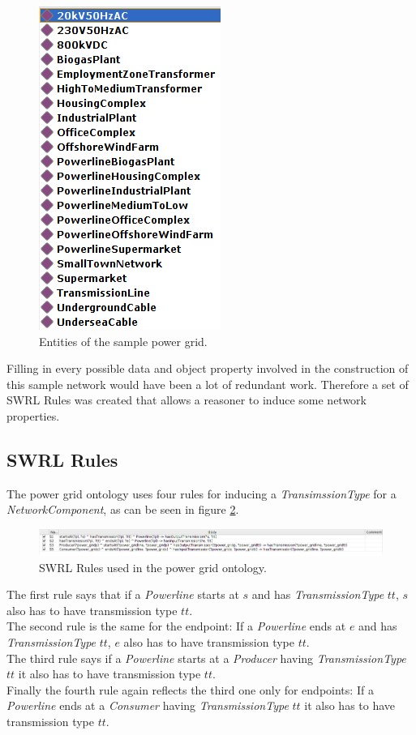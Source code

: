 \begin{figure}
\centering
\includegraphics[width=.3\textwidth]{img/entities.png}
\caption{Entities of the sample power grid.}
\label{fig:entities}
\end{figure}

Filling in every possible data and object property involved in the construction of this sample network would have been a lot of redundant work. Therefore a set of SWRL Rules was created that allows a reasoner to induce some network properties.

\subsection{SWRL Rules}

The power grid ontology uses four rules for inducing a \textit{TransimssionType} for a \textit{NetworkComponent}, as can be seen in figure \ref{fig:swrlRules}. \\

\begin{figure}[h]
\centering
\includegraphics[width=\textwidth]{img/swrlRules.png}
\caption{SWRL Rules used in the power grid ontology.}
\label{fig:swrlRules}
\end{figure}

\newpage

The first rule says that if a \textit{Powerline} starts at $s$ and has \textit{TransmissionType} $tt$,
$s$ also has to have transmission type $tt$. \\
The second rule is the same for the endpoint:
If a \textit{Powerline} ends at $e$ and has \textit{TransmissionType} $tt$,
$e$ also has to have transmission type $tt$. \\
The third rule says if a \textit{Powerline} starts at a \textit{Producer} having \textit{TransmissionType} $tt$ it also has to have transmission type $tt$. \\
Finally the fourth rule again reflects the third one only for endpoints: 
If a \textit{Powerline} ends at a \textit{Consumer} having \textit{TransmissionType} $tt$ it also has to have transmission type $tt$.
